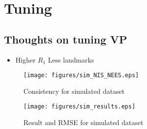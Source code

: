 \section{Tuning}\label{sec:tuning}


\subsection{Thoughts on tuning VP}


\begin{itemize}
    \item Higher $R_1$ Less landmarks
\end{itemize}



\begin{figure}
    \centering
    \texttt{[image: figures/sim\_NIS\_NEES.eps]}
    \caption{Consistency for simulated dataset}
	\label{fig:1_1}
\end{figure}
\begin{figure}
    \centering
    \texttt{[image: figures/sim\_results.eps]}
    \caption{Result and RMSE for simulated dataset}
	\label{fig:1_2}
\end{figure}


